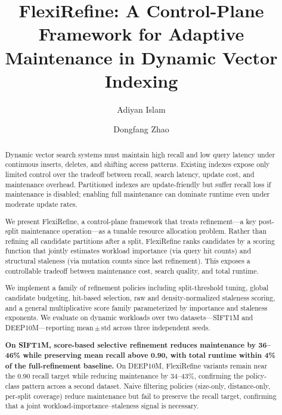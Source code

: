 \documentclass[sigconf, nonacm]{acmart}
\newcommand{\system}{FlexiRefine\xspace}
\begin{document}
\title{FlexiRefine: A Control-Plane Framework for Adaptive Maintenance
       in Dynamic Vector Indexing}

\author{Adiyan Islam}
\author{Dongfang Zhao}

\begin{abstract}

Dynamic vector search systems must maintain high recall and low query
latency under continuous inserts, deletes, and shifting access patterns.
Existing indexes expose only limited control over the tradeoff between
recall, search latency, update cost, and maintenance overhead.
Partitioned indexes are update-friendly but suffer recall loss if
maintenance is disabled; enabling full maintenance can dominate
runtime even under moderate update rates.

We present \system, a control-plane framework that treats
refinement---a key post-split maintenance operation---as a tunable
resource allocation problem. Rather than refining all candidate
partitions after a split, \system ranks candidates by a scoring
function that jointly estimates workload importance (via query hit
counts) and structural staleness (via mutation counts since last
refinement). This exposes a controllable tradeoff between maintenance
cost, search quality, and total runtime.

We implement a family of refinement policies including split-threshold
tuning, global candidate budgeting, hit-based selection,
raw and density-normalized staleness scoring, and a general multiplicative
score family parameterized by importance and staleness exponents.
We evaluate on dynamic workloads over two datasets---SIFT1M and
DEEP10M---reporting mean\,$\pm$\,std across three independent seeds.

\textbf{On SIFT1M, score-based selective refinement reduces maintenance
by 36--46\% while preserving mean recall above 0.90, with total runtime
within 4\% of the full-refinement baseline.}
On DEEP10M, FlexiRefine variants remain near the 0.90 recall target
while reducing maintenance by 34--43\%, confirming the policy-class
pattern across a second dataset.
Naive filtering policies (size-only, distance-only, per-split coverage)
reduce maintenance but fail to preserve the recall target, confirming
that a joint workload-importance--staleness signal is necessary.
\end{abstract}
\end{document}
